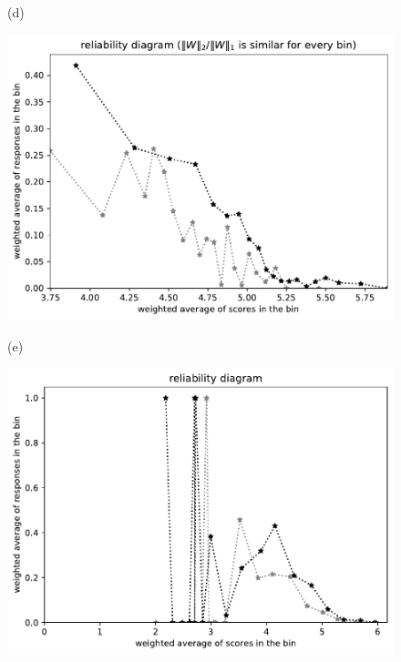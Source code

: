 \documentclass{article}
\newlength{\vertsep}
\newlength{\imsize}
\begin{document}
\begin{figure}
\begin{centering}
(d)
\parbox{\imsize}{\includegraphics[width=\imsize]
{../codes/weighted/County_of_San_Francisco_vs_Kern-LNGI/equierrs20.pdf}}
\quad\quad
(e)
\parbox{\imsize}{\includegraphics[width=\imsize]
{../codes/weighted/County_of_San_Francisco_vs_Kern-LNGI/equiscores20.pdf}}

\vspace{\vertsep}


\end{centering}
\end{figure}
\end{document}
